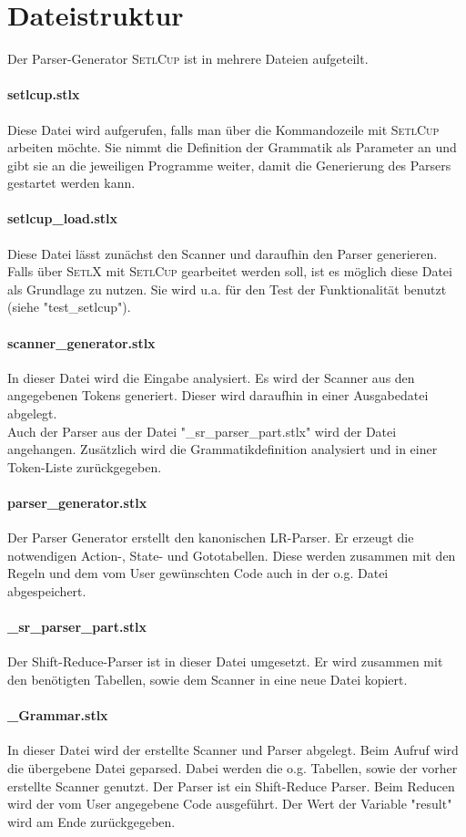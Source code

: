 \section{Dateistruktur}
Der Parser-Generator \textsc{SetlCup} ist in mehrere Dateien aufgeteilt.
\paragraph{setlcup.stlx} Diese Datei wird aufgerufen, falls man über die Kommandozeile mit \textsc{SetlCup} arbeiten möchte. Sie nimmt die Definition der Grammatik als Parameter an und gibt sie an die jeweiligen Programme weiter, damit die Generierung des Parsers gestartet werden kann.
\paragraph{setlcup\_load.stlx} Diese Datei lässt zunächst den Scanner und daraufhin den Parser generieren. Falls über \textsc{SetlX} mit \textsc{SetlCup} gearbeitet werden soll, ist es möglich diese Datei als Grundlage zu nutzen. Sie wird u.a. für den Test der Funktionalität benutzt (siehe "test\_setlcup").
\paragraph{scanner\_generator.stlx} In dieser Datei wird die Eingabe analysiert. Es wird der Scanner aus den angegebenen Tokens generiert. Dieser wird daraufhin in einer Ausgabedatei abgelegt. \\
Auch der Parser aus der Datei "\_sr\_parser\_part.stlx" wird der Datei angehangen. Zusätzlich wird die Grammatikdefinition analysiert und  in einer Token-Liste zurückgegeben.
\paragraph{parser\_generator.stlx} Der Parser Generator erstellt den kanonischen LR-Parser. Er erzeugt die notwendigen Action-, State- und Gototabellen. Diese werden zusammen mit den Regeln und dem vom User gewünschten Code auch in der o.g. Datei abgespeichert. 
\paragraph{\_sr\_parser\_part.stlx} Der Shift-Reduce-Parser ist in dieser Datei umgesetzt. Er wird zusammen mit den benötigten Tabellen, sowie dem Scanner in eine neue Datei kopiert. 
\paragraph{\_Grammar.stlx} In dieser Datei wird der erstellte Scanner und Parser abgelegt. Beim Aufruf wird die übergebene Datei geparsed. Dabei werden die o.g. Tabellen, sowie der vorher erstellte Scanner genutzt. Der Parser ist ein Shift-Reduce Parser. Beim Reducen wird der vom User angegebene Code ausgeführt. Der Wert der Variable "result" wird am Ende zurückgegeben.
